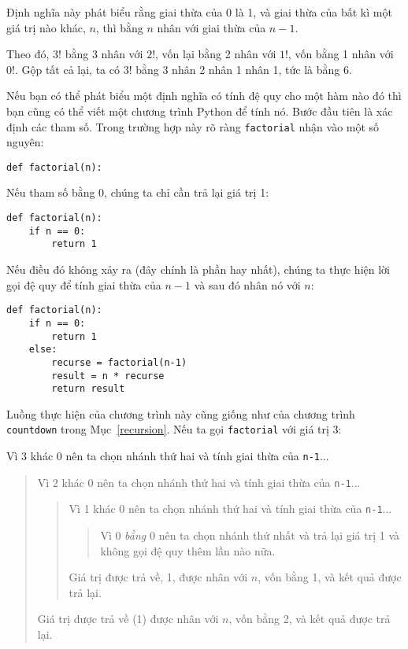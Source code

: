 \documentclass[11pt]{book}
\begin{document}
Định nghĩa này phát biểu rằng giai thừa của 0 là 1, và giai thừa của
bất kì một giá trị nào khác, $n$, thì bằng $n$ nhân với giai thừa của $n-1$.

Theo đó, $3!$ bằng 3 nhân với $2!$, vốn lại bằng 2 nhân với $1!$, vốn bằng
1 nhân với $0!$. Gộp tất cả lại, ta có $3!$ bằng 3 nhân 2 nhân 1 nhân 1,
tức là bằng 6.


Nếu bạn có thể phát biểu một định nghĩa có tính đệ quy cho một 
hàm nào đó thì bạn cũng có thể viết một chương trình Python để 
tính nó. Bước đầu tiên là xác định các tham số. Trong trường hợp này
rõ ràng {\tt factorial} nhận vào một số nguyên:

\beforeverb
\begin{verbatim}
def factorial(n):
\end{verbatim}
\afterverb
%
Nếu tham số bằng 0, chúng ta chỉ cần trả lại giá trị 1:

\beforeverb
\begin{verbatim}
def factorial(n):
    if n == 0:
        return 1
\end{verbatim}
\afterverb
%
Nếu điều đó không xảy ra (đây chính là phần hay nhất), chúng ta 
thực hiện lời gọi đệ quy để tính giai thừa của $n-1$ và sau đó nhân nó
với $n$:

\beforeverb
\begin{verbatim}
def factorial(n):
    if n == 0:
        return 1
    else:
        recurse = factorial(n-1)
        result = n * recurse
        return result
\end{verbatim}
\afterverb
%
Luồng thực hiện của chương trình này cũng giống như của chương trình
{\tt countdown} trong Mục~\ref{recursion}.  Nếu ta gọi {\tt factorial}
với giá trị 3:

Vì 3 khác 0 nên ta chọn nhánh thứ hai và tính giai thừa của {\tt n-1}...

\begin{quote}
Vì 2 khác 0 nên ta chọn nhánh thứ hai và tính giai thừa của {\tt n-1}...

  \begin{quote}
  Vì 1 khác 0 nên ta chọn nhánh thứ hai và tính giai thừa của {\tt n-1}...

    \begin{quote}
    Vì 0 {\em bằng} 0 nên ta chọn nhánh thứ nhất và trả lại giá trị 1
    và không gọi đệ quy thêm lần nào nữa.
    \end{quote}

  Giá trị được trả về, 1, được nhân với $n$, vốn bằng 1, và kết quả 
  được trả lại.
  \end{quote}

Giá trị được trả về (1) được nhân với $n$, vốn bằng 2, và kết quả 
được trả lại.
\end{quote}
\end{document}
